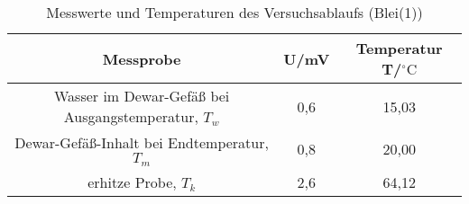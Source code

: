 \begin{table}[h]
	\begin{center}
		\begin{tabular}{ccc}
			Messprobe & U/mV & Temperatur T/$^{\circ}\mathrm{C}$\\ \hline
			Wasser im Dewar-Gefäß bei Ausgangstemperatur, $T_w$&0,6&15,03\\
			Dewar-Gefäß-Inhalt bei Endtemperatur, $T_m$&0,8&20,00\\
			erhitze Probe, $T_k$&2,6&64,12
		\end{tabular}
		\caption{Messwerte und Temperaturen des Versuchsablaufs (Blei(1))}
		\label{tabblei1}
	\end{center}
\end{table}